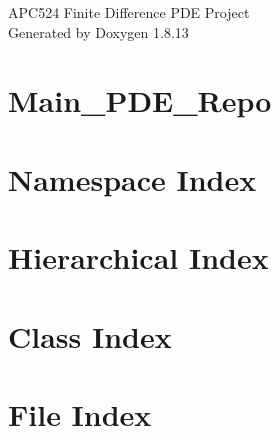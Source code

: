 \documentclass[twoside]{book}
\newcommand{\+}{\discretionary{\mbox{\scriptsize$\hookleftarrow$}}{}{}}
\newcommand{\clearemptydoublepage}{%
  \newpage{\pagestyle{empty}\cleardoublepage}%
}
\begin{document}
\hypersetup{pageanchor=false,
             bookmarksnumbered=true,
             pdfencoding=unicode
            }
\begin{titlepage}
\vspace*{7cm}
\begin{center}%
{\Large A\+P\+C524 Finite Difference P\+DE Project }\\
\vspace*{1cm}
{\large Generated by Doxygen 1.8.13}\\
\end{center}
\end{titlepage}
\clearemptydoublepage
{}
\tableofcontents
\clearemptydoublepage
{}
\hypersetup{pageanchor=true}

\chapter{Main\+\_\+\+P\+D\+E\+\_\+\+Repo}
\label{md_README}

\chapter{Namespace Index}

\chapter{Hierarchical Index}

\chapter{Class Index}

\chapter{File Index}

\end{document}
